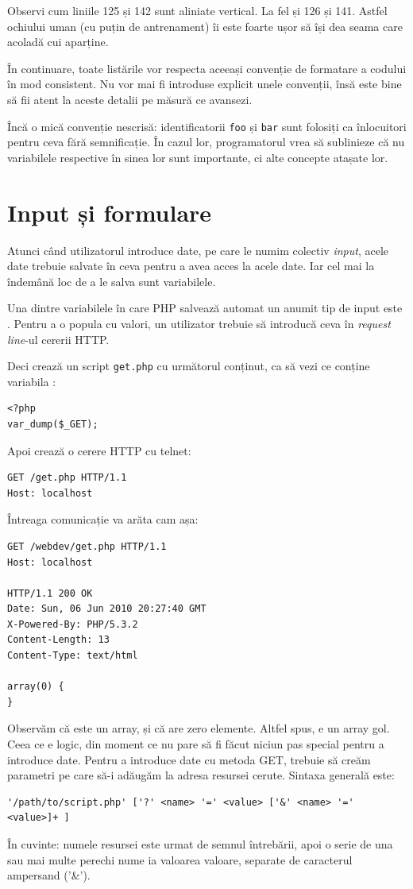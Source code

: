 Observi cum liniile 125 și 142 sunt aliniate vertical. La fel și 126 și 141. Astfel ochiului uman (cu puțin de antrenament)
îi este foarte ușor să își dea seama care acoladă cui aparține.

În continuare, toate listările vor respecta aceeași convenție de formatare a codului
în mod consistent. Nu vor mai fi introduse explicit unele convenții, însă este bine să fii atent
la aceste detalii pe măsură ce avansezi.

Încă o mică convenție nescrisă: identificatorii \texttt{foo} și \texttt{bar} sunt folosiți ca înlocuitori
pentru ceva fără semnificație. În cazul lor, programatorul vrea să sublinieze că nu variabilele respective
în sinea lor sunt importante, ci alte concepte atașate lor.

\section{Input și formulare}
Atunci când utilizatorul introduce date, pe care le numim colectiv \textsl{input},
acele date trebuie salvate în ceva pentru a avea acces la acele date. Iar cel
mai la îndemână loc de a le salva sunt variabilele.

Una dintre variabilele în care PHP salvează automat un anumit tip de input este \get.
Pentru a o popula cu valori, un utilizator trebuie să introducă ceva în \textsl{request line}-ul
cererii HTTP.

Deci crează un script \texttt{get.php} cu următorul conținut, ca să vezi ce conține variabila \get:
\begin{lstlisting}
<?php
var_dump($_GET);
\end{lstlisting}
Apoi crează o cerere HTTP cu telnet:
\begin{verbatim}
GET /get.php HTTP/1.1
Host: localhost

\end{verbatim}
Întreaga comunicație va arăta cam așa:
\begin{verbatim}
GET /webdev/get.php HTTP/1.1
Host: localhost

HTTP/1.1 200 OK
Date: Sun, 06 Jun 2010 20:27:40 GMT
X-Powered-By: PHP/5.3.2
Content-Length: 13
Content-Type: text/html

array(0) {
}
\end{verbatim}
Observăm că {\get} este un array, și că are zero elemente. Altfel spus,
e un array gol. Ceea ce e logic, din moment ce nu pare să fi făcut niciun
pas special pentru a introduce date. Pentru a introduce date cu metoda GET,
trebuie să creăm parametri pe care să-i adăugăm la adresa resursei cerute.
Sintaxa generală este:
\begin{verbatim}
'/path/to/script.php' ['?' <name> '=' <value> ['&' <name> '=' <value>]+ ]
\end{verbatim}
În cuvinte: numele resursei este urmat de semnul întrebării, apoi o serie de
una sau mai multe perechi nume {\glqq}ia valoarea{\grqq} valoare, separate de caracterul
ampersand ('\&').

